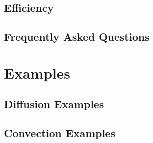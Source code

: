 \documentclass[letterpaper,twoside,openright,10pt]{memoir}
\begin{document}
\chapter{Efficiency}
\label{chap:Efficiency}




\chapter{Frequently Asked Questions}
\label{chap:FAQ}




% 
% 
% 



\sloppy

\part{Examples}
\label{part:Examples}



\renewcommand{\ptctitle}{Example Contents}
\parttoc

\chapter{Diffusion Examples}


\label{sec:Examples:diffusion:mesh1D}





\chapter{Convection Examples}
\end{document}
